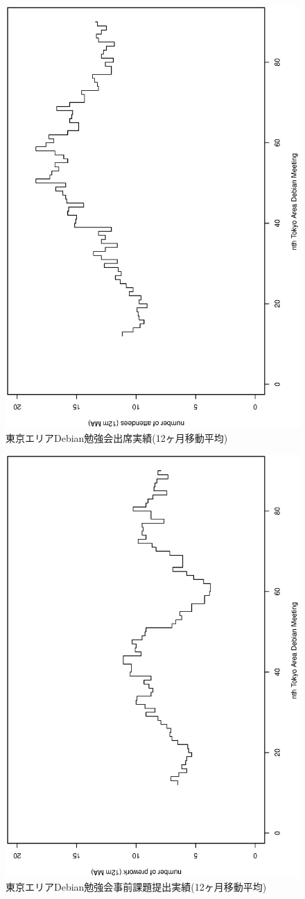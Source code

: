 \documentclass[mingoth,a4paper]{jsarticle}
\begin{document}
\begin{figure}[ht]
\begin{center}
 \includegraphics[width=0.7\hsize,angle=270]{image201212/memberanalysis/attend.eps}
\caption{東京エリアDebian勉強会出席実績(12ヶ月移動平均)}\label{fig:tokyoattend2012}
\end{center}
\end{figure}

\begin{figure}[ht]
\begin{center}
 \includegraphics[width=0.7\hsize,angle=270]{image201212/memberanalysis/prework.eps}
\caption{東京エリアDebian勉強会事前課題提出実績(12ヶ月移動平均)}\label{fig:tokyoprework2012}
\end{center}
\end{figure}
\end{document}
